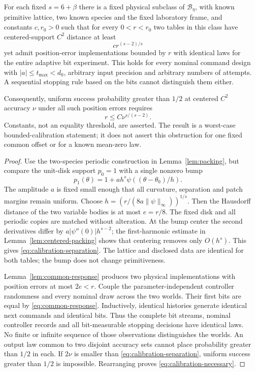 \begin{theorem}
\label{thm:calibration-floor}
For each fixed $s=6+\beta$ there is a fixed physical subclass of
$\mathcal B_\eta$, with known primitive lattice, two known species
and the fixed laboratory frame, and constants $c,r_0>0$ such that
for every $0<r<r_0$ two tables in this class have centered-support
$C^2$ distance at least
\begin{equation}\label{eq:calibration-separation}
                            c r^{(s-2)/s}
\end{equation}
yet admit position-error implementations bounded by $r$ with identical
laws for the entire adaptive bit experiment. This holds for every
nominal command design with $|a|\le t_{\max}<d_0$, arbitrary input
precision and arbitrary numbers of attempts. A sequential stopping
rule based on the bits cannot distinguish them either.

Consequently, uniform success probability greater than $1/2$ at
centered $C^2$ accuracy $\nu$ under all such position errors requires
\begin{equation}\label{eq:calibration-necessary}
                            r\le C\nu^{s/(s-2)}.
\end{equation}
Constants, not an equality threshold, are asserted. The result is a
worst-case bounded-calibration statement; it does not assert this
obstruction for one fixed common offset or for a known mean-zero law.
\end{theorem}
\begin{proof}
Use the two-species periodic construction in Lemma~\ref{lem:packing},
but compare the unit-disk support $p_0=1$ with a single nonzero bump
\[
 p_1(\theta)=1+a h^s\psi((\theta-\theta_0)/h).
\]
The amplitude $a$ is fixed small enough that all curvature, separation
and patch margins remain uniform. Choose
$h=(r/(8a\|\psi\|_\infty))^{1/s}$. Then the Hausdorff distance of
the two variable bodies is at most $e=r/8$. The fixed disk and all
periodic copies are matched without alteration. At the bump center
the second derivatives differ by $a|\psi''(0)|h^{s-2}$; the
first-harmonic estimate in Lemma~\ref{lem:centered-packing} shows that
centering removes only $O(h^s)$. This gives
\eqref{eq:calibration-separation}. The lattice and disclosed data are
identical for both tables; the bump does not change primitiveness.

Lemma~\ref{lem:common-response} produces two physical implementations
with position errors at most $2e<r$. Couple the parameter-independent
controller randomness and every nominal draw across the two worlds.
Their first bits are equal by \eqref{eq:common-response}. Inductively,
identical histories generate identical next commands and identical
bits. Thus the complete bit streams, nominal controller records and
all bit-measurable stopping decisions have identical laws. No finite
or infinite sequence of those observations distinguishes the worlds.
An output law common to two disjoint accuracy sets cannot place
probability greater than $1/2$ in each. If $2\nu$ is smaller than
\eqref{eq:calibration-separation}, uniform success greater than $1/2$
is impossible. Rearranging proves \eqref{eq:calibration-necessary}.
\end{proof}

